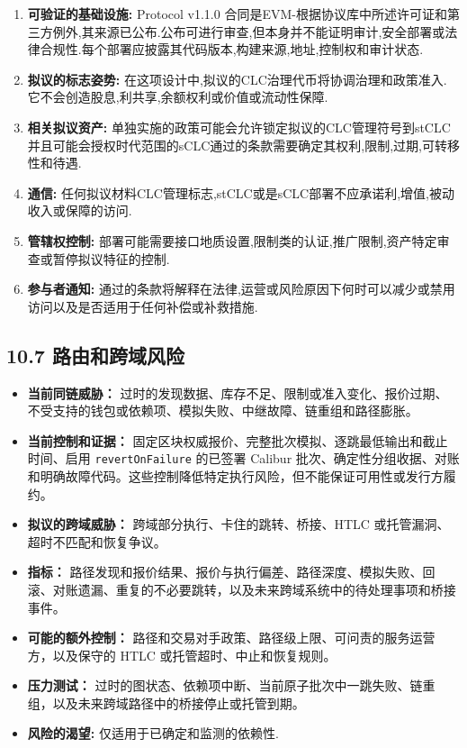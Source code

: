 \documentclass[11pt]{article}
\begin{document}
\begin{enumerate}[leftmargin=*]
\item \textbf{可验证的基础设施:} Protocol v1.1.0 合同是EVM-根据协议库中所述许可证和第三方例外,其来源已公布.公布可进行审查,但本身并不能证明审计,安全部署或法律合规性.每个部署应披露其代码版本,构建来源,地址,控制权和审计状态.
\item \textbf{拟议的标志姿势:} 在这项设计中,拟议的CLC治理代币将协调治理和政策准入. 它不会创造股息,利共享,余额权利或价值或流动性保障.
\item \textbf{相关拟议资产:} 单独实施的政策可能会允许锁定拟议的CLC管理符号到stCLC并且可能会授权时代范围的sCLC通过的条款需要确定其权利,限制,过期,可转移性和待遇.
\item \textbf{通信:} 任何拟议材料CLC管理标志,stCLC或是sCLC部署不应承诺利,增值,被动收入或保障的访问.
\item \textbf{管辖权控制:} 部署可能需要接口地质设置,限制类的认证,推广限制,资产特定审查或暂停拟议特征的控制.
\item \textbf{参与者通知:} 通过的条款将解释在法律,运营或风险原因下何时可以减少或禁用访问以及是否适用于任何补偿或补救措施.
\end{enumerate}
\subsection*{10.7 路由和跨域风险}

\begin{itemize}[leftmargin=*]
\item \textbf{当前同链威胁：} 过时的发现数据、库存不足、限制或准入变化、报价过期、不受支持的钱包或依赖项、模拟失败、中继故障、链重组和路径膨胀。
\item \textbf{当前控制和证据：} 固定区块权威报价、完整批次模拟、逐跳最低输出和截止时间、启用 \texttt{revertOnFailure} 的已签署 Calibur 批次、确定性分组收据、对账和明确故障代码。这些控制降低特定执行风险，但不能保证可用性或发行方履约。
\item \textbf{拟议的跨域威胁：} 跨域部分执行、卡住的跳转、桥接、HTLC 或托管漏洞、超时不匹配和恢复争议。
\item \textbf{指标：} 路径发现和报价结果、报价与执行偏差、路径深度、模拟失败、回滚、对账遗漏、重复的不必要跳转，以及未来跨域系统中的待处理事项和桥接事件。
\item \textbf{可能的额外控制：} 路径和交易对手政策、路径级上限、可问责的服务运营方，以及保守的 HTLC 或托管超时、中止和恢复规则。
\item \textbf{压力测试：} 过时的图状态、依赖项中断、当前原子批次中一跳失败、链重组，以及未来跨域路径中的桥接停止或托管到期。
\item \textbf{风险的渴望:} 仅适用于已确定和监测的依赖性.
\end{itemize}
\end{document}
